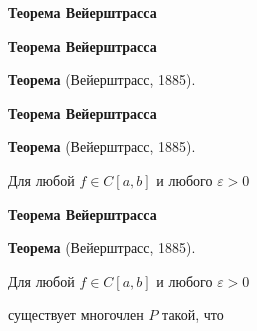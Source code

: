 \documentclass[11pt]{article}
\begin{document}
\newpage

\begin{center}
{\color{notaeYELLOW}\bfseries\fontsize{44}{52}\selectfont Теорема Вейерштрасса}
\end{center}
\vspace*{\fill}
\begin{center}
\fontsize{36}{43}\selectfont
\end{center}
\vspace*{\fill}

\newpage

\begin{center}
{\color{notaeYELLOW}\bfseries\fontsize{44}{52}\selectfont Теорема Вейерштрасса}
\end{center}
\vspace*{\fill}
\begin{center}
\fontsize{36}{43}\selectfont
\textbf{Теорема} (Вейерштрасс, 1885).\par\vspace{0.4in}
\end{center}
\vspace*{\fill}

\newpage

\begin{center}
{\color{notaeYELLOW}\bfseries\fontsize{44}{52}\selectfont Теорема Вейерштрасса}
\end{center}
\vspace*{\fill}
\begin{center}
\fontsize{36}{43}\selectfont
\textbf{Теорема} (Вейерштрасс, 1885).\par\vspace{0.4in}
Для любой $f \in C[a,b]$ и любого $\varepsilon>0$\par\vspace{0.4in}
\end{center}
\vspace*{\fill}

\newpage

\begin{center}
{\color{notaeYELLOW}\bfseries\fontsize{44}{52}\selectfont Теорема Вейерштрасса}
\end{center}
\vspace*{\fill}
\begin{center}
\fontsize{36}{43}\selectfont
\textbf{Теорема} (Вейерштрасс, 1885).\par\vspace{0.4in}
Для любой $f \in C[a,b]$ и любого $\varepsilon>0$\par\vspace{0.4in}
существует многочлен $P$ такой, что\par\vspace{0.4in}
\end{center}
\vspace*{\fill}
\end{document}
